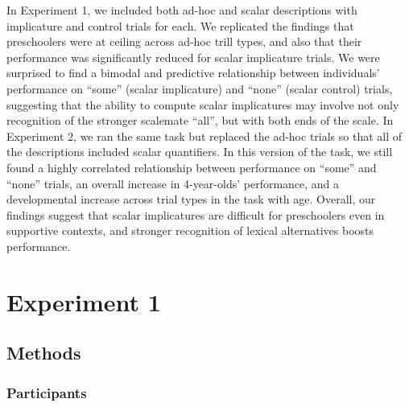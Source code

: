 \documentclass[10pt,letterpaper]{article}
\begin{document}
In Experiment 1, we included both ad-hoc and scalar descriptions with implicature and control trials for each. We replicated the findings that preschoolers were at ceiling across ad-hoc trill types, and also that their performance was significantly reduced for scalar implicature trials. We were surprised to find a bimodal and predictive relationship between individuals' performance on ``some'' (scalar implicature) and ``none'' (scalar control) trials, suggesting that the ability to compute scalar implicatures may involve not only recognition of the stronger scalemate ``all'', but with both ends of the scale. In Experiment 2, we ran the same task but replaced the ad-hoc trials so that all of the descriptions included scalar quantifiers. In this version of the task, we still found a highly correlated relationship between performance on ``some'' and ``none'' trials, an overall increase in 4-year-olds' performance, and a developmental increase across trial types in the task with age. Overall, our findings suggest that scalar implicatures are difficult for preschoolers even in supportive contexts, and stronger recognition of lexical alternatives boosts performance. 





	

\section{Experiment 1} 

\subsection{Methods}
\subsubsection{Participants}
\end{document}
